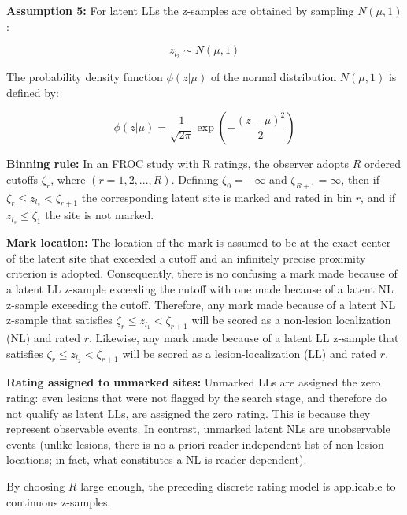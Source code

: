 \documentclass[
]{book}
\begin{document}
\textbf{Assumption 5:} For latent LLs the z-samples are obtained by sampling \(N \left ( \mu, 1 \right )\):

\begin{equation} 
z_{l_2} \sim N \left ( \mu, 1 \right )
\label{eq:rsm-sampling-l2}
\end{equation}

The probability density function \(\phi\left ( z | \mu \right )\) of the normal distribution \(N \left ( \mu, 1 \right )\) is defined by:

\begin{equation} 
\phi\left ( z | \mu \right )=\frac{1}{\sqrt{2\pi}}\exp\left ( -\frac{(z-\mu)^2}{2} \right )
\label{eq:rsm-pdf-phi-mu}
\end{equation}

\textbf{Binning rule:} In an FROC study with R ratings, the observer adopts \(R\) ordered cutoffs \(\zeta_r\), where \(\left ( r = 1, 2, ..., R \right )\). Defining \(\zeta_0 = -\infty\) and \(\zeta_{R+1} = \infty\), then if \(\zeta_r \leq z_{l_s} < \zeta_{r+1}\) the corresponding latent site is marked and rated in bin \(r\), and if \(z_{l_s} \leq \zeta_1\) the site is not marked.

\textbf{Mark location:} The location of the mark is assumed to be at the exact center of the latent site that exceeded a cutoff and an infinitely precise proximity criterion is adopted. Consequently, there is no confusing a mark made because of a latent LL z-sample exceeding the cutoff with one made because of a latent NL z-sample exceeding the cutoff. Therefore, any mark made because of a latent NL z-sample that satisfies \(\zeta_r \leq z_{l_1} < \zeta_{r+1}\) will be scored as a non-lesion localization (NL) and rated \(r\). Likewise, any mark made because of a latent LL z-sample that satisfies \(\zeta_r \leq z_{l_2} < \zeta_{r+1}\) will be scored as a lesion-localization (LL) and rated \(r\).

\textbf{Rating assigned to unmarked sites:} Unmarked LLs are assigned the zero rating: even lesions that were not flagged by the search stage, and therefore do not qualify as latent LLs, are assigned the zero rating. This is because they represent observable events. In contrast, unmarked latent NLs are unobservable events (unlike lesions, there is no a-priori reader-independent list of non-lesion locations; in fact, what constitutes a NL is reader dependent).

By choosing \(R\) large enough, the preceding discrete rating model is applicable to continuous z-samples.
\end{document}
